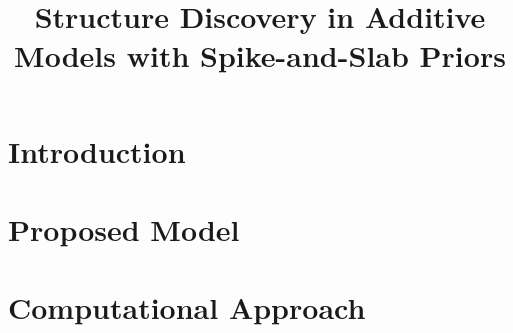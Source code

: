 \documentclass[12pt]{article}
\title{Structure Discovery in Additive Models with Spike-and-Slab Priors}
\begin{document}
\def\by{\mathbf{y}}
\def\bY{\mathbf{Y}}
\def\bx{\mathbf{x}}
\def\bX{\mathbf{X}}

\def\bz{\bm{z}}

\def\bphi{\boldsymbol{\phi}}
\def\bpsi{\boldsymbol{\psi}}
\def\br{\mathbf{r}} %
\def\bR{\mathbf{R}}%
\def\bg{\mathbf{g}}
\def\balpha{\boldsymbol{\alpha}}
\def\bbeta{\boldsymbol{\beta}}
\def\bB{\mathbf{B}}
\def\bphi{\boldsymbol{\phi}}
\def\bPhi{\boldsymbol{\Phi}}
\def\bpsi{\boldsymbol{\psi}}
\def\bPsi{\boldsymbol{\Psi}}


\def\bgamma{\boldsymbol{\gamma}} %
\def\btheta{\boldsymbol{\theta}} %
\def\tilbtheta{\tilde{\btheta}}
\def\R{\mathbb{R}}
\def\P{\mathbb{P}}
\def\E{\mathbb{E}}
\def\N{\mathcal{N}}



\newpage

\onehalfspacing

\section{Introduction}
\label{sec:introduction}



\section{Proposed Model}
\label{sec:proposed_model}


\section{Computational Approach}
\label{sec:computation}


\newpage

\end{document}
